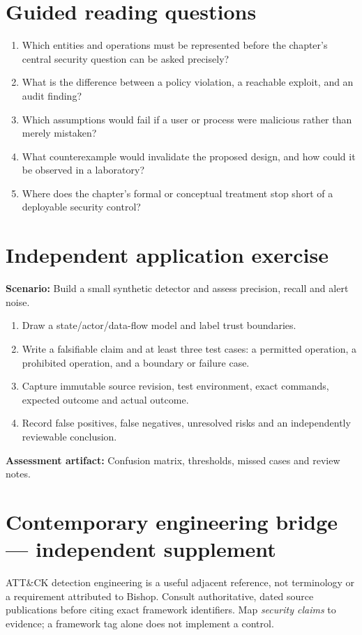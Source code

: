 \documentclass[10pt,letterpaper]{article}
\begin{document}
\section{Guided reading questions}
\begin{enumerate}
\item Which entities and operations must be represented before the chapter's central security question can be asked precisely?
\item What is the difference between a policy violation, a reachable exploit, and an audit finding?
\item Which assumptions would fail if a user or process were malicious rather than merely mistaken?
\item What counterexample would invalidate the proposed design, and how could it be observed in a laboratory?
\item Where does the chapter's formal or conceptual treatment stop short of a deployable security control?
\end{enumerate}
\section{Independent application exercise}
\textbf{Scenario:} Build a small synthetic detector and assess precision, recall and alert noise.
\begin{enumerate}
\item Draw a state/actor/data-flow model and label trust boundaries.
\item Write a falsifiable claim and at least three test cases: a permitted operation, a prohibited operation, and a boundary or failure case.
\item Capture immutable source revision, test environment, exact commands, expected outcome and actual outcome.
\item Record false positives, false negatives, unresolved risks and an independently reviewable conclusion.
\end{enumerate}
\textbf{Assessment artifact:} Confusion matrix, thresholds, missed cases and review notes.
\section{Contemporary engineering bridge --- independent supplement}
ATT\&CK detection engineering is a useful adjacent reference, not terminology or a requirement attributed to Bishop. Consult authoritative, dated source publications before citing exact framework identifiers. Map \emph{security claims} to evidence; a framework tag alone does not implement a control.
\end{document}
